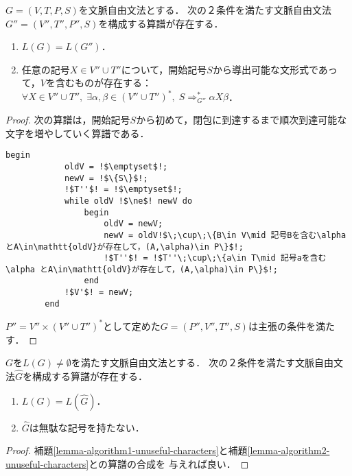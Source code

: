 \documentclass[uplatex, dvipdfmx]{jsreport}
\begin{document}
\begin{lemma}[開始記号から到達可能でない文字の除去算譜]\label{lemma-algorithm2-unuseful-characters}
    $G=(V,T,P,S)$を文脈自由文法とする．
    次の２条件を満たす文脈自由文法$G''=(V'',T'',P'',S)$を構成する算譜が存在する．
    \begin{enumerate}
        \item $L(G)=L(G'')$．
        \item 任意の記号$X\in V''\cup T''$について，開始記号$S$から導出可能な文形式であって，$V$を含むものが存在する：$\forall X\in V''\cup T'',\;\exists\alpha,\beta\in(V''\cup T'')^*,\;S\Rightarrow^*_{G''}\alpha X\beta$．
    \end{enumerate}
\end{lemma}
\begin{proof}
    次の算譜は，開始記号$S$から初めて，閉包に到達するまで順次到達可能な文字を増やしていく算譜である．
    \begin{lstlisting}[escapechar=!]
        begin
            oldV = !$\emptyset$!;
            newV = !$\{S\}$!;
            !$T''$! = !$\emptyset$!;
            while oldV !$\ne$! newV do
                begin
                    oldV = newV;
                    newV = oldV!$\;\cup\;\{B\in V\mid 記号Bを含む\alpha とA\in\mathtt{oldV}が存在して，(A,\alpha)\in P\}$!;
                    !$T''$! = !$T''\;\cup\;\{a\in T\mid 記号aを含む\alpha とA\in\mathtt{oldV}が存在して，(A,\alpha)\in P\}$!;
                end
            !$V'$! = newV;
        end
    \end{lstlisting}
    $P''=V''\times(V''\cup T'')^*$として定めた$G=(P'',V'',T'',S)$は主張の条件を満たす．
\end{proof}

\begin{theorem}[無駄な記号の除去算譜]\label{thm-CFL-elimination-1}
    $G$を$L(G)\ne\emptyset$を満たす文脈自由文法とする．
    次の２条件を満たす文脈自由文法$\hat{G}$を構成する算譜が存在する．
    \begin{enumerate}
        \item $L(G)=L(\hat{G})$．
        \item $\hat{G}$は無駄な記号を持たない．
    \end{enumerate}
\end{theorem}
\begin{proof}
    補題\ref{lemma-algorithm1-unuseful-characters}と補題\ref{lemma-algorithm2-unuseful-characters}との算譜の合成を
    与えれば良い．
\end{proof}
\end{document}
